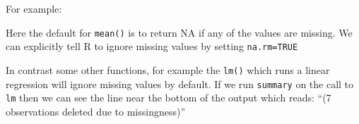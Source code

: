 \documentclass[]{article}
\newenvironment{Shaded}{\begin{snugshade}}{\end{snugshade}}
\newcommand{\DataTypeTok}[1]{\textcolor[rgb]{0.13,0.29,0.53}{#1}}
\newcommand{\DecValTok}[1]{\textcolor[rgb]{0.00,0.00,0.81}{#1}}
\newcommand{\FloatTok}[1]{\textcolor[rgb]{0.00,0.00,0.81}{#1}}
\newcommand{\KeywordTok}[1]{\textcolor[rgb]{0.13,0.29,0.53}{\textbf{#1}}}
\newcommand{\NormalTok}[1]{#1}
\newcommand{\OperatorTok}[1]{\textcolor[rgb]{0.81,0.36,0.00}{\textbf{#1}}}
\newcommand{\OtherTok}[1]{\textcolor[rgb]{0.56,0.35,0.01}{#1}}
\begin{document}
For example:

\begin{Shaded}
\end{Shaded}

Here the default for \texttt{mean()} is to return NA if any of the values are missing. We can explicitly tell R to ignore missing values by setting \texttt{na.rm=TRUE}

\begin{Shaded}
\end{Shaded}

In contrast some other functions, for example the \texttt{lm()} which runs a linear regression will ignore missing values by default. If we run \texttt{summary} on the call to \texttt{lm} then we can see the line near the bottom of the output which reads: ``(7 observations deleted due to missingness)''
\end{document}
